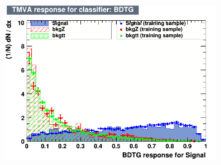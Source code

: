 \begin{figure}[!htbp]
  \centering
  
  \begin{subfigure}[b]{0.495\textwidth}
    \centering
    \includegraphics[width=\linewidth]{images/plots_overtrain_lt200/overtrain_Signal_BDTG.png}
    \label{fig:overtrain_signal}
  \end{subfigure}
  

\end{figure}
